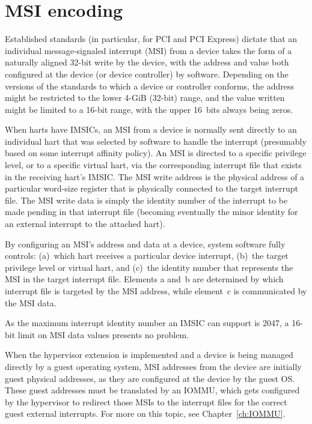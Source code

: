 \section{MSI encoding}
\label{sec:MSIEncoding}

Established standards (in particular, for PCI and PCI Express) dictate
that an individual message-signaled interrupt (MSI) from a device takes
the form of a naturally aligned \mbox{32-bit} write by the device,
with the address and value both configured at the device (or device
controller) by software.
Depending on the versions of the standards to which a device or
controller conforms, the address might be restricted to the lower
\mbox{4-GiB} (\mbox{32-bit}) range, and the value written might be
limited to a \mbox{16-bit} range, with the upper 16~bits always being
zeros.

When {\RISCV} harts have IMSICs, an MSI from a device is normally sent
directly to an individual hart that was selected by software to handle
the interrupt (presumably based on some interrupt affinity policy).
An MSI is directed to a specific privilege level, or to a specific
virtual hart, via the corresponding interrupt file that exists in the
receiving hart's IMSIC.
The MSI write address is the physical address of a particular word-size
register that is physically connected to the target interrupt file.
The MSI write data is simply the identity number of the interrupt to
be made pending in that interrupt file (becoming eventually the minor
identity for an external interrupt to the attached hart).

By configuring an MSI's address and data at a device, system software
fully controls:
(a)~which hart receives a particular device interrupt,
(b)~the target privilege level or virtual hart, and
(c)~the identity number that represents the MSI in the target interrupt
file.
Elements a and~b are determined by which interrupt file is targeted by
the MSI address, while element~c is communicated by the MSI data.

\begin{commentary}
As the maximum interrupt identity number an IMSIC can support is 2047,
a \mbox{16-bit} limit on MSI data values presents no problem.
\end{commentary}

When the hypervisor extension is implemented and a device is being
managed directly by a guest operating system, MSI addresses from the
device are initially guest physical addresses, as they are configured
at the device by the guest OS.
These guest addresses must be translated by an \mbox{IOMMU}, which gets
configured by the hypervisor to redirect those MSIs to the interrupt
files for the correct guest external interrupts.
For more on this topic, see Chapter~\ref{ch:IOMMU}.

